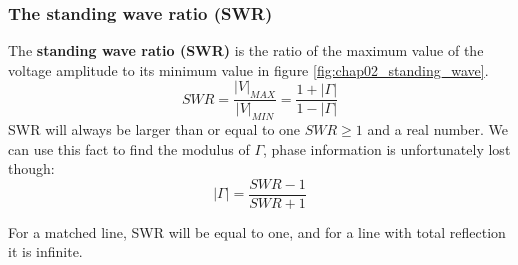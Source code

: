\documentclass[../transmission.tex]{subfiles}
\begin{document}
			\subsubsection{The standing wave ratio (SWR)}
				The \textbf{standing wave ratio (SWR)} is the ratio of the maximum value of the voltage amplitude to its minimum value in figure \ref{fig:chap02_standing_wave}.
				\begin{equation}
					SWR=\frac{|V|_{MAX}}{|V|_{MIN}}=\frac{1+|\Gamma|}{1-|\Gamma|}
				\end{equation}
				SWR will always be larger than or equal to one $SWR\geq1$ and a real number. We can use this fact to find the modulus of $\Gamma$, phase information is unfortunately lost though:
				\begin{equation}
					|\Gamma|=\frac{SWR-1}{SWR+1}
				\end{equation}
				
				For a matched line, SWR will be equal to one, and for a line with total reflection it is infinite. 
\end{document}
